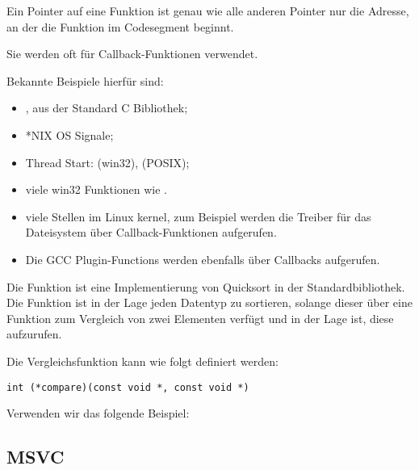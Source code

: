 \newcommand{\comp}{\TT{comp()}\xspace}
\label{sec:pointerstofunctions}

\myindex{\CLanguageElements!\Pointers}
Ein Pointer auf eine Funktion ist genau wie alle anderen Pointer nur die Adresse, an der die Funktion im Codesegment
beginnt.

Sie werden oft für Callback-Funktionen verwendet.

Bekannte Beispiele hierfür sind:

\begin{itemize}
\item \qsort,  aus der Standard C Bibliothek; 

\item *NIX OS Signale;

\item Thread Start:  (win32),  (POSIX);

\item viele win32 Funktionen wie .

\item viele Stellen im Linux kernel, zum Beispiel werden die Treiber für das Dateisystem über Callback-Funktionen
aufgerufen.

\item Die GCC Plugin-Functions werden ebenfalls über Callbacks aufgerufen.
\end{itemize}

\label{qsort}
Die Funktion \qsort ist eine Implementierung von Quicksort in der \CCpp Standardbibliothek.
Die Funktion ist in der Lage jeden Datentyp zu sortieren, solange dieser über eine Funktion zum Vergleich von zwei
Elementen verfügt und \qsort in der Lage ist, diese aufzurufen.

Die Vergleichsfunktion kann wie folgt definiert werden:

\begin{lstlisting}
int (*compare)(const void *, const void *)
\end{lstlisting}

Verwenden wir das folgende Beispiel:



\subsection{MSVC}

